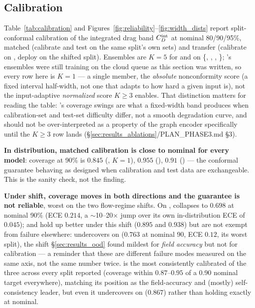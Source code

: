 \documentclass[11pt,a4paper]{article}
\begin{document}
\subsection{Calibration}
\label{sec:results_calibration}

Table~\ref{tab:calibration} and Figures~\ref{fig:reliability}--\ref{fig:width_dists}
report split-conformal calibration of the integrated drag band $C_D^{\text{int}}$ at
nominal 80/90/95\%, matched (calibrate and test on the same split's own sets)
and transfer (calibrate on , deploy on the shifted split).
Ensembles are $K=5$ for \Mfno{} and \Mtrans{} on \{,
, , \}; \Mgnn's ensembles
were still training on the cloud queue as this section was written, so every
\Mgnn{} row here is $K=1$ --- a single member, the \emph{absolute} nonconformity
score (a fixed interval half-width, not one that adapts to how hard a given
input is), not the input-adaptive \emph{normalized} score $K\geq3$ enables. That
distinction matters for reading the table: \Mgnn's coverage swings are what a
fixed-width band produces when calibration-set and test-set difficulty differ,
not a smooth degradation curve, and should not be over-interpreted as a
property of the graph encoder specifically until the $K\geq3$ row lands
(\S\ref{sec:results_ablations}/PLAN\_PHASE3.md \S3).

\textbf{In distribution, matched calibration is close to nominal for every
model}: \Cdint{} coverage at 90\% is $0.845$ (\Mgnn, $K{=}1$), $0.955$ (\Mfno),
$0.91$ (\Mtrans) --- the conformal guarantee behaving as designed when
calibration and test data are exchangeable. This is the sanity check, not the
finding.

\textbf{Under shift, coverage moves in both directions and the guarantee is not
reliable}, worst on the two flow-regime shifts. On , \Mgnn{}
collapses to $0.698$ at nominal 90\% (ECE $0.214$, a $\sim$10--20$\times$ jump
over its own in-distribution ECE of $0.045$); \Mfno{} and \Mtrans{} hold up
better under this shift ($0.895$ and $0.938$) but are not exempt from failure
elsewhere: \Mfno{} undercovers on  ($0.763$ at nominal 90,
ECE $0.12$, its worst split), the shift \S\ref{sec:results_ood} found mildest
for \emph{field accuracy} but not for calibration --- a reminder that these are
different failure modes measured on the same axis, not the same number twice.
\Mtrans{} is the most consistently calibrated of the three across every split
reported (coverage within $0.87$--$0.95$ of a 0.90 nominal target everywhere),
matching its position as the field-accuracy and (mostly) self-consistency
leader, but even it undercovers on  ($0.867$) rather than
holding exactly at nominal.
\end{document}
